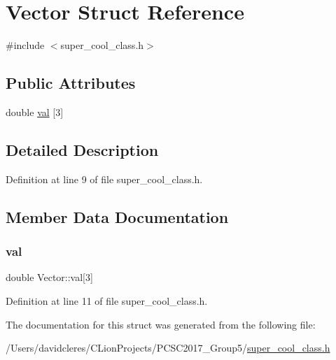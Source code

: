 \hypertarget{struct_vector}{}\section{Vector Struct Reference}
\label{struct_vector}


{\ttfamily \#include $<$super\+\_\+cool\+\_\+class.\+h$>$}

\subsection*{Public Attributes}
\begin{DoxyCompactItemize}
\item 
double \mbox{\hyperlink{struct_vector_adc995472c3e3bd817a76e705f2eddc90}{val}} \mbox{[}3\mbox{]}
\end{DoxyCompactItemize}


\subsection{Detailed Description}


Definition at line 9 of file super\+\_\+cool\+\_\+class.\+h.



\subsection{Member Data Documentation}
\mbox{\label{struct_vector_adc995472c3e3bd817a76e705f2eddc90}} 
\subsubsection{\texorpdfstring{val}{val}}
{\footnotesize\ttfamily double Vector\+::val\mbox{[}3\mbox{]}}



Definition at line 11 of file super\+\_\+cool\+\_\+class.\+h.



The documentation for this struct was generated from the following file\+:\begin{DoxyCompactItemize}
\item 
/\+Users/davidcleres/\+C\+Lion\+Projects/\+P\+C\+S\+C2017\+\_\+\+Group5/\mbox{\hyperlink{super__cool__class_8h}{super\+\_\+cool\+\_\+class.\+h}}\end{DoxyCompactItemize}
